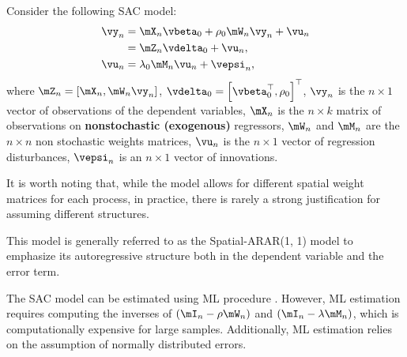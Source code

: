 \documentclass[english,12pt]{book}\usepackage[]{graphicx}\usepackage[]{xcolor}
\begin{document}
Consider the following SAC model:
\begin{equation}\label{eq:model_gmm_sac}
\begin{aligned}
	\vy_n & = \mX_n\vbeta_0 + \rho_0\mW_n\vy_n + \vu_n   \\
	     & = \mZ_n\vdelta_0 + \vu_n,\\
	\vu_n  & = \lambda_0 \mM_n \vu_n + \vepsi_n,
\end{aligned}
\end{equation}
%
where $\mZ_n = \left[\mX_n, \mW_n\vy_n\right]$, $\vdelta_0 = \left[\vbeta_0^\top ,\rho_0\right]^\top$, $\vy_n$ is the $n\times 1$ vector of observations of the dependent variables, $\mX_n$ is the $n \times k$ matrix of observations on \textbf{nonstochastic (exogenous)} regressors, $\mW_n$ and $\mM_n$ are the $n \times n$ non stochastic weights matrices, $\vu_n$ is the $n \times 1$ vector of regression disturbances, $\vepsi_n$ is an $n \times 1$ vector of innovations. 

It is worth noting that, while the model allows for different spatial weight matrices for each process, in practice, there is rarely a strong justification for assuming different structures.

\begin{remark}
This model is generally referred to as the Spatial-ARAR(1, 1) model to emphasize its autoregressive structure both in the dependent variable and the error term. 
\end{remark}

The SAC model can be estimated using ML procedure \citep[see][]{anselin1988spatial}. However, ML estimation requires computing the inverses of $\left(\mI_n - \rho\mW_n\right)$ and $\left(\mI_n - \lambda \mM_n\right)$, which is computationally expensive for large samples. Additionally, ML estimation relies on the assumption of normally distributed errors.
\end{document}
